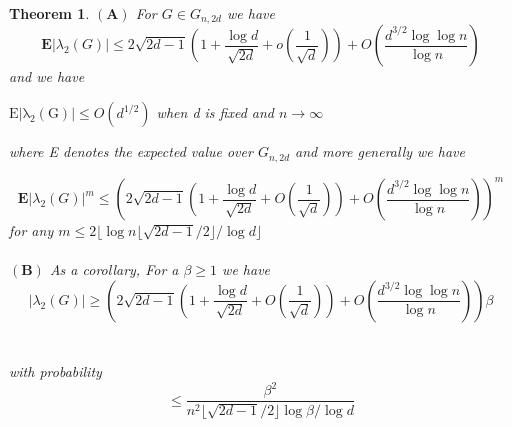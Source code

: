 \documentclass[oneside]{book}
\newtheorem{theorem}{Theorem}[section]
\begin{document}
	\begin{theorem} \label{t:13}
		$ \left(\mathbf{A} \right) $ For $G \in{G}_{n, 2d}$ we have
		$$
		\mathbf{E}\left|\lambda_{2}(G)\right| \leq 2 \sqrt{2 d-1}\left(1+\frac{\log d}{\sqrt{2 d}}+o\left(\frac{1}{\sqrt{d}}\right)\right)+O\left(\frac{d^{3 / 2} \log \log n}{\log n}\right)
		$$  and we have \begin{center}
			$\mathrm{E|\lambda_{2}(G)|} \leq O(d^{1/2})$ when d is fixed and $n\rightarrow \infty$
		\end{center}
		where E denotes the expected
		value over ${G}_{n, 2d}$      and more generally we have
		
		
		$$\mathbf{E}\left|\lambda_{2}(G)\right|^{m} \leq\left(2 \sqrt{2 d-1}\left(1+\frac{\log d}{\sqrt{2 d}}+O\left(\frac{1}{\sqrt{d}}\right)\right)+O\left(\frac{d^{3 / 2} \log \log n}{\log n}\right)\right)^{m}$$ 
		for any $ m \leq 2\lfloor\log n\lfloor\sqrt{2 d-1} / 2\rfloor / \log d\rfloor$\\\\
		$ \left(\mathbf{B}\right) $   As a corollary, For a $\beta\geq 1$ we have 
		$$\left|\lambda_{2}(G)\right| \geq\left(2 \sqrt{2 d-1}\left(1+\frac{\log d}{\sqrt{2 d}}+O\left(\frac{1}{\sqrt{d}}\right)\right)+O\left(\frac{d^{3 / 2} \log \log n}{\log n}\right)\right) \beta$$\\\\
		with probability
		$$
		\leq \frac{\beta^{2}}{n^{2}\lfloor\sqrt{2 d-1} / 2\rfloor \log \beta / \log d}
		$$   \\\\
	\end{theorem}
\end{document}

